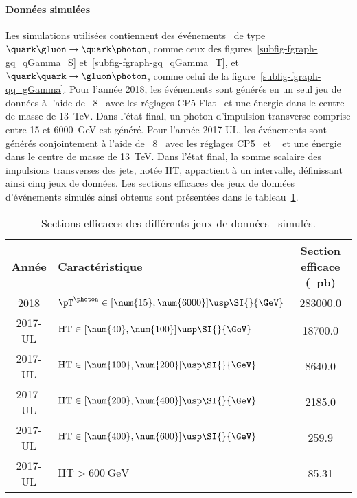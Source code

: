 \paragraph{Données simulées}
Les simulations utilisées contiennent des événements \Gjets\ de type $\quark\gluon\to\quark\photon$, comme ceux des figures~\ref{subfig-fgraph-gq_qGamma_S} et~\ref{subfig-fgraph-gq_qGamma_T}, et $\quark\quark\to\gluon\photon$, comme celui de la figure~\ref{subfig-fgraph-qq_gGamma}.
Pour l'année 2018, les événements sont générés en un seul jeu de données
à l'aide de \PYTHIA~8~\cite{pythia8.2}
avec les réglages CP5-Flat~\cite{tunes_2019}
et une énergie dans le centre de masse de \SI{13}{\TeV}.
Dans l'état final, un photon d'impulsion transverse comprise entre \num{15} et \SI{6000}{\GeV} est généré.
Pour l'année 2017-UL, les événements sont générés conjointement
à l'aide de \PYTHIA~8~\cite{pythia8.2}
avec les réglages CP5~\cite{tunes_2019}
et
\MADGRAPHc~\cite{madgraph5}
et une énergie dans le centre de masse de \SI{13}{\TeV}.
Dans l'état final, la somme scalaire des impulsions transverses des jets, notée HT, appartient à un intervalle, définissant ainsi cinq jeux de données.
Les sections efficaces des jeux de données d'événements simulés ainsi obtenus sont présentées dans le tableau~\ref{tab-MC_xsec_2018_and_2017UL_GJet}.
\begin{table}[h]
\centering
\begin{tabular}{clc}
\toprule
Année & Caractéristique & Section efficace (\SI{}{\pico\barn})\\
\midrule
2018 & $\pT^{\photon}\in [\num{15}, \num{6000}]\usp\SI{}{\GeV}$ & \num{283000.0}\\
2017-UL & $\text{HT} \in [\num{40}, \num{100}]\usp\SI{}{\GeV}$ & \num{18700.0} \\
2017-UL & $\text{HT} \in [\num{100}, \num{200}]\usp\SI{}{\GeV}$ & \num{8640.0} \\
2017-UL & $\text{HT} \in [\num{200}, \num{400}]\usp\SI{}{\GeV}$ & \num{2185.0} \\
2017-UL & $\text{HT} \in [\num{400}, \num{600}]\usp\SI{}{\GeV}$ & \num{259.9} \\
2017-UL & $\text{HT} > \SI{600}{\GeV}$ & \num{85.31} \\
\bottomrule
\end{tabular}
\caption{Sections efficaces des différents jeux de données \Gjets\ simulés.}
\label{tab-MC_xsec_2018_and_2017UL_GJet}
\end{table}
